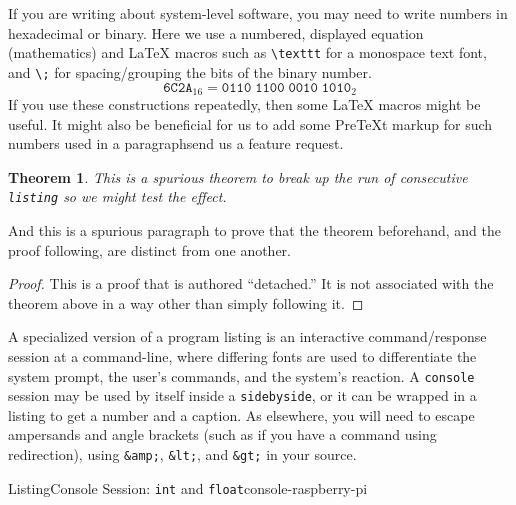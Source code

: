 \documentclass{amsart}
\theoremstyle{plain}%
\newtheorem{theorem}{Theorem}[section]
\theoremstyle{definition}%
\theoremstyle{remark}%
\newcommand{\mono}[1]{\texttt{#1}}
\numberwithin{equation}{section}
\newcommand{\consoleinput}[1]{\textbf{#1}}
\begin{document}
%
If you are writing about system-level software, you may need to write numbers in hexadecimal or binary.  Here we use a numbered, displayed equation (mathematics) and \LaTeX{} macros such as \mono{\textbackslash{}texttt} for a monospace text font, and \mono{\textbackslash{};} for spacing\slash{}grouping the bits of the binary number.%
\begin{equation}
\texttt{6C2A}_{16} = \texttt{0110}\;\texttt{1100}\;\texttt{0010}\;\texttt{1010}_{2}\label{section-programs-23-4}
\end{equation}
If you use these constructions repeatedly, then some \LaTeX{} macros might be useful.  It might also be beneficial for us to add some PreTeXt markup for such numbers used in a paragraph\textemdash{}send us a feature request.%
\begin{theorem}\label{theorem-detached}%
%
This is a spurious theorem to break up the run of consecutive \mono{listing} so we might test the effect.%
\end{theorem}
And this is a spurious paragraph to prove that the theorem beforehand, and the proof following, are distinct from one another.%
\begin{proof}\label{section-programs-26}%
This is a proof that is authored ``detached.''  It is not associated with the theorem above in a way other than simply following it.%
\end{proof}
A specialized version of a program listing is an interactive command\slash{}response session at a command-line, where differing fonts are used to differentiate the system prompt, the user's commands, and the system's reaction.  A   \mono{console} session may be used by itself inside a \mono{sidebyside}, or it can be wrapped in a listing to get a number and a caption.  As elsewhere, you will need to escape ampersands and angle brackets (such as if you have a command using redirection), using \mono{\&amp;}, \mono{\&lt;}, and \mono{\&gt;} in your source.%
\begin{listingptx}{Listing}{Console Session: \mono{int} and \mono{float}}{console-raspberry-pi}{}%
\tcblower
\end{listingptx}%
\end{document}
